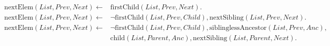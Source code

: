 \documentclass[twocolumn,10pt]{article}
\begin{document}
\begin{figure*}
\begin{align*}
\\
    \mathrm{nextElem}(\mathit{List}, \mathit{Prev}, \mathit{Next}) \leftarrow &
    \mathrm{firstChild}(\mathit{List}, \mathit{Prev}, \mathit{Next}).
\\
    \mathrm{nextElem}(\mathit{List}, \mathit{Prev}, \mathit{Next}) \leftarrow &
    \neg\mathrm{firstChild}(\mathit{List}, \mathit{Prev}, \mathit{Child}),
    \mathrm{nextSibling}(\mathit{List}, \mathit{Prev}, \mathit{Next}).
\\
    \mathrm{nextElem}(\mathit{List}, \mathit{Prev}, \mathit{Next}) \leftarrow &
    \neg\mathrm{firstChild}(\mathit{List}, \mathit{Prev}, \mathit{Child}),
    \mathrm{siblinglessAncestor}(\mathit{List}, \mathit{Prev}, \mathit{Anc}), \\&
    \mathrm{child}(\mathit{List}, \mathit{Parent}, \mathit{Anc}),
    \mathrm{nextSibling}(\mathit{List}, \mathit{Parent}, \mathit{Next}).
\end{align*}
\end{figure*}

{\footnotesize

{}}
\end{document}
